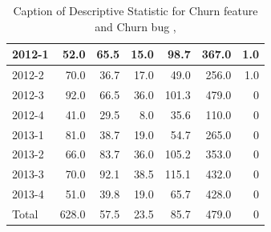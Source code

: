 \documentclass[UKenglish]{ifimaster}  %
\begin{document}
\begin{appendices}
\begin{table}[!htbp]
\begin{adjustwidth}{-2.5cm}{}
{{\begin{tabular}{ | l | r | r | r | r | r | r | }
2012-1 & 52.0 & 65.5 & 15.0 & 98.7 & 367.0 & 1.0\\ \hline
2012-2 & 70.0 & 36.7 & 17.0 & 49.0 & 256.0 & 1.0\\ \hline
2012-3 & 92.0 & 66.5 & 36.0 & 101.3 & 479.0 & 0\\ \hline
2012-4 & 41.0 & 29.5 & 8.0 & 35.6 & 110.0 & 0\\ \hline
2013-1 & 81.0 & 38.7 & 19.0 & 54.7 & 265.0 & 0\\ \hline
2013-2 & 66.0 & 83.7 & 36.0 & 105.2 & 353.0 & 0\\ \hline
2013-3 & 70.0 & 92.1 & 38.5 & 115.1 & 432.0 & 0\\ \hline
2013-4 & 51.0 & 39.8 & 19.0 & 65.7 & 428.0 & 0\\ \hline
Total & 628.0 & 57.5 & 23.5 & 85.7 & 479.0 & 0\\ \hline

\end{tabular}
}
}
\end{adjustwidth}
\caption[Optional caption for list of figures]{Caption of Descriptive Statistic for Churn feature and Churn bug  , }
\label{DS:9:4} %
\end{table}




\end{appendices}
\end{document}
